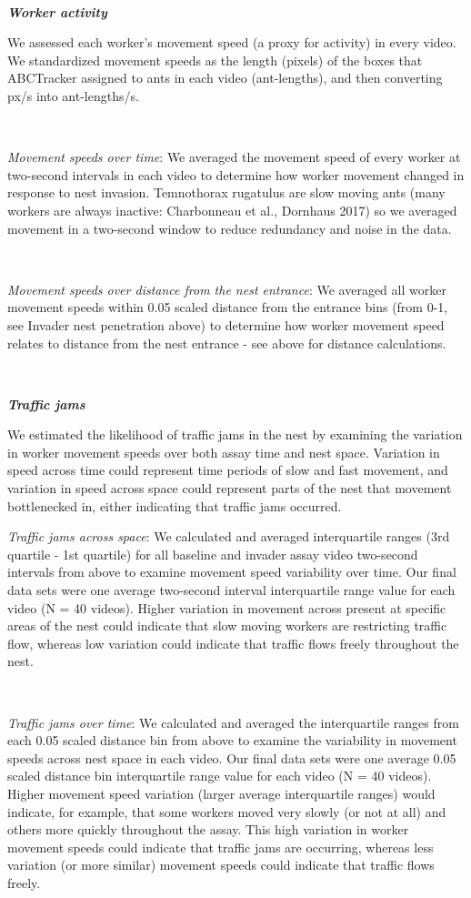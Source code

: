 \documentclass[3p]{elsarticle} %
\begin{document}
~

\textbf{\emph{Worker activity}}

We assessed each worker's movement speed (a proxy for activity) in every
video. We standardized movement speeds as the length (pixels) of the
boxes that ABCTracker assigned to ants in each video (ant-lengths), and
then converting px/s into ant-lengths/s.

~

\emph{Movement speeds over time}: We averaged the movement speed of
every worker at two-second intervals in each video to determine how
worker movement changed in response to nest invasion. Temnothorax
rugatulus are slow moving ants (many workers are always inactive:
Charbonneau et al., Dornhaus 2017) so we averaged movement in a
two-second window to reduce redundancy and noise in the data.

~

\emph{Movement speeds over distance from the nest entrance}: We averaged
all worker movement speeds within 0.05 scaled distance from the entrance
bins (from 0-1, see Invader nest penetration above) to determine how
worker movement speed relates to distance from the nest entrance - see
above for distance calculations.

~

\textbf{\emph{Traffic jams}}

We estimated the likelihood of traffic jams in the nest by examining the
variation in worker movement speeds over both assay time and nest space.
Variation in speed across time could represent time periods of slow and
fast movement, and variation in speed across space could represent parts
of the nest that movement bottlenecked in, either indicating that
traffic jams occurred.

\emph{Traffic jams across space}: We calculated and averaged
interquartile ranges (3rd quartile - 1st quartile) for all baseline and
invader assay video two-second intervals from above to examine movement
speed variability over time. Our final data sets were one average
two-second interval interquartile range value for each video (N = 40
videos). Higher variation in movement across present at specific areas
of the nest could indicate that slow moving workers are restricting
traffic flow, whereas low variation could indicate that traffic flows
freely throughout the nest.

~

\emph{Traffic jams over time}: We calculated and averaged the
interquartile ranges from each 0.05 scaled distance bin from above to
examine the variability in movement speeds across nest space in each
video. Our final data sets were one average 0.05 scaled distance bin
interquartile range value for each video (N = 40 videos). Higher
movement speed variation (larger average interquartile ranges) would
indicate, for example, that some workers moved very slowly (or not at
all) and others more quickly throughout the assay. This high variation
in worker movement speeds could indicate that traffic jams are
occurring, whereas less variation (or more similar) movement speeds
could indicate that traffic flows freely.
\end{document}
